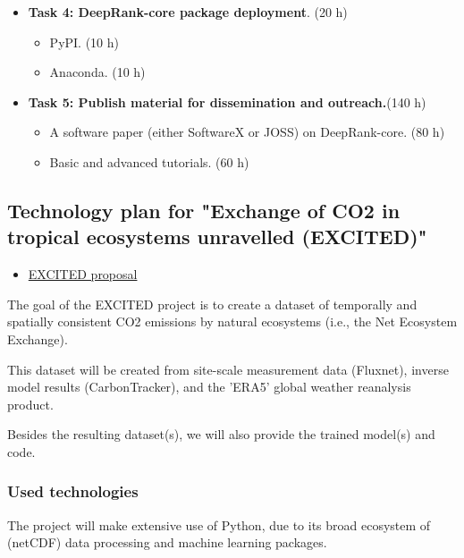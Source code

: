 \begin{itemize}
\item \textbf{Task 4: DeepRank-core package deployment}. (20 h)
\begin{itemize}
\item PyPI. (10 h)
\item Anaconda. (10 h)
\end{itemize}
\end{itemize}



\begin{itemize}
\item \textbf{Task 5: Publish material for dissemination and outreach.}(140 h)
\begin{itemize}
\item A software paper (either SoftwareX or JOSS) on DeepRank-core. (80 h)
\item Basic and advanced tutorials. (60 h)
\end{itemize}
\end{itemize}


\clearpage
\subsection{Technology plan for "Exchange of CO2 in tropical ecosystems unravelled (EXCITED)"}

\bigskip
\begin{itemize}
\item \href{https://nlesc.sharepoint.com/:b:/s/all/EZ6Iu_0k89tLkdZALfb7QagBD6t2hy4UkI8jYjyMHoVFnw?e=5BldjB}{EXCITED proposal}
\end{itemize}

The goal of the EXCITED project is to create a dataset of temporally and spatially consistent CO2 emissions by natural
ecosystems (i.e., the Net Ecosystem Exchange). 

This dataset will be created from site-scale measurement data (Fluxnet), inverse model results (CarbonTracker), and the 'ERA5' global weather reanalysis product. 

Besides the resulting dataset(s), we will also provide the trained model(s) and code. 

\subsubsection{Used technologies}

The project will make extensive use of Python, due to its broad ecosystem of (netCDF) data processing and machine
learning packages. 


